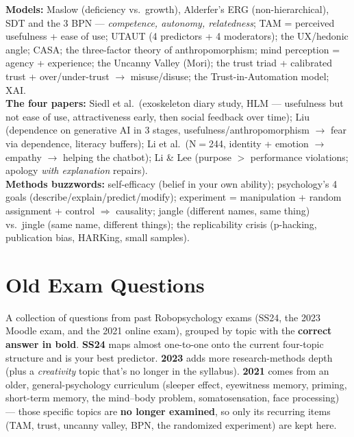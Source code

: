 \documentclass[11pt, oneside]{book}
\begin{document}
\begin{notebox}[title={Quick exam checklist}]
\textbf{Models:} Maslow (deficiency vs.\ growth), Alderfer's ERG
(non-hierarchical), SDT and the 3 BPN — \emph{competence, autonomy,
relatedness}; TAM = perceived usefulness + ease of use; UTAUT (4 predictors +
4 moderators); the UX/hedonic angle; CASA; the three-factor theory of
anthropomorphism; mind perception = agency + experience; the Uncanny Valley
(Mori); the trust triad + calibrated trust + over/under-trust $\to$
misuse/disuse; the Trust-in-Automation model; XAI.\\
\textbf{The four papers:} Siedl et al.\ (exoskeleton diary study, HLM —
usefulness but not ease of use, attractiveness early, then social feedback
over time); Liu (dependence on generative AI in 3 stages,
usefulness/anthropomorphism $\to$ fear via dependence, literacy buffers); Li
et al.\ (N$=$244, identity + emotion $\to$ empathy $\to$ helping the chatbot);
Li \& Lee (purpose $>$ performance violations; apology \emph{with explanation}
repairs).\\
\textbf{Methods buzzwords:} self-efficacy (belief in your own ability);
psychology's 4 goals (describe/explain/predict/modify); experiment =
manipulation + random assignment + control $\Rightarrow$ causality; jangle
(different names, same thing) vs.\ jingle (same name, different things); the
replicability crisis (p-hacking, publication bias, HARKing, small samples).
\end{notebox}


\chapter{Old Exam Questions}

A collection of questions from past Robopsychology exams (SS24, the 2023
Moodle exam, and the 2021 online exam), grouped by topic with the
\textbf{correct answer in bold}. \textbf{SS24} maps almost one-to-one onto the
current four-topic structure and is your best predictor. \textbf{2023} adds
more research-methods depth (plus a \emph{creativity} topic that's no longer in
the syllabus). \textbf{2021} comes from an older, general-psychology curriculum
(sleeper effect, eyewitness memory, priming, short-term memory, the mind--body
problem, somatosensation, face processing) — those specific topics are
\textbf{no longer examined}, so only its recurring items (TAM, trust, uncanny
valley, BPN, the randomized experiment) are kept here.
\end{document}
